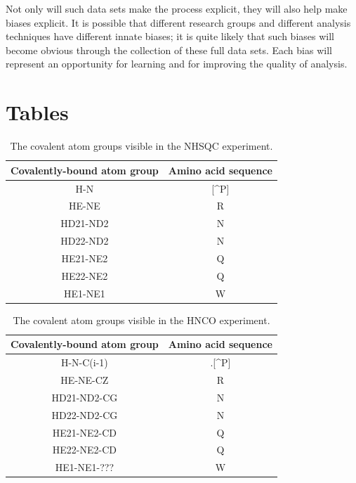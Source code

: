 Not only will such data sets make the process explicit, they will also help
make biases explicit.  It is possible that different research groups and
different analysis techniques have different innate biases; it is quite likely
that such biases will become obvious through the collection of these full data
sets.  Each bias will represent an opportunity for learning and for improving
the quality of analysis.


\clearpage
\section{Tables}

\begin{table}[h]
  \begin{tabular}{ | c | c | }
    \hline
    Covalently-bound atom group  &  Amino acid sequence  \\  \hline
    H-N                          &  [\^{}P]              \\  \hline
    HE-NE                        &  R                    \\  \hline
    HD21-ND2                     &  N                    \\  \hline
    HD22-ND2                     &  N                    \\  \hline
    HE21-NE2                     &  Q                    \\  \hline
    HE22-NE2                     &  Q                    \\  \hline
    HE1-NE1                      &  W                    \\  \hline
  \end{tabular}
  \caption{The covalent atom groups visible in the NHSQC experiment.}
  \label{nhsqc_peaktypes}
\end{table}

\begin{table}
  \begin{tabular}{ | c | c | }
    \hline
    Covalently-bound atom group  &  Amino acid sequence  \\  \hline
    H-N-C(i-1)                   &  .[\^{}P]             \\  \hline
    HE-NE-CZ                     &  R                    \\  \hline
    HD21-ND2-CG                  &  N                    \\  \hline
    HD22-ND2-CG                  &  N                    \\  \hline
    HE21-NE2-CD                  &  Q                    \\  \hline
    HE22-NE2-CD                  &  Q                    \\  \hline
    HE1-NE1-???                  &  W                    \\  \hline  %
  \end{tabular}
  \caption{The covalent atom groups visible in the HNCO experiment.}
  \label{hnco_peaktypes}
\end{table}
    
